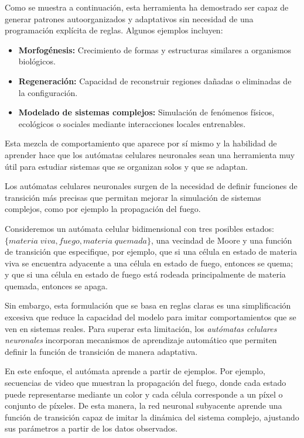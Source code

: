 Como se muestra a continuación, esta herramienta ha demostrado ser capaz de generar patrones autoorganizados y adaptativos sin necesidad de una programación explícita de reglas. Algunos ejemplos incluyen:

\begin{itemize}
	
	\item \textbf{Morfogénesis:} Crecimiento de formas y estructuras similares a organismos biológicos.
	
	\item \textbf{Regeneración:} Capacidad de reconstruir regiones dañadas o eliminadas de la configuración.
	
	\item \textbf{Modelado de sistemas complejos:} Simulación de fenómenos físicos, ecológicos o sociales mediante interacciones locales entrenables.
	
\end{itemize}

Esta mezcla de comportamiento que aparece por sí mismo y la habilidad de aprender hace que los autómatas celulares neuronales sean una herramienta muy útil para estudiar sistemas que se organizan solos y que se adaptan.

Los autómatas celulares neuronales surgen de la necesidad de definir funciones de transición más precisas que permitan mejorar la simulación de sistemas complejos, como por ejemplo la propagación del fuego. 

Consideremos un autómata celular bidimensional con tres posibles estados: $\{ materia \; viva, fuego, materia\; quemada \}$, una vecindad de Moore y una función de transición que especifique, por ejemplo, que si una célula en estado de materia viva se encuentra adyacente a una célula en estado de fuego, entonces se quema; y que si una célula en estado de fuego está rodeada principalmente de materia quemada, entonces se apaga.

Sin embargo, esta formulación que se basa en reglas claras es una simplificación excesiva que reduce la capacidad del modelo para imitar comportamientos que se ven en sistemas reales. Para superar esta limitación, los \textit{autómatas celulares neuronales} incorporan mecanismos de aprendizaje automático que permiten definir la función de transición de manera adaptativa. 

En este enfoque, el autómata aprende a partir de ejemplos. Por ejemplo, secuencias de video que muestran la propagación del fuego, donde cada estado puede representarse mediante un color y cada célula corresponde a un píxel o conjunto de píxeles. De esta manera, la red neuronal subyacente aprende una función de transición capaz de imitar la dinámica del sistema complejo, ajustando sus parámetros a partir de los datos observados.

